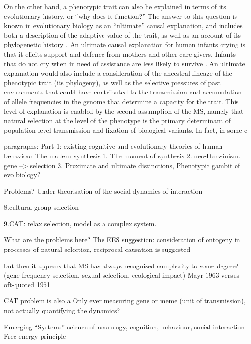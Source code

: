On the other hand, a phenotypic trait can also be explained in terms of its evolutionary history, or ``why does it function?''  The answer to this question is known in evolutionary biology as an ``ultimate'' causal explanation, and includes both a description of the adaptive value of the trait, as well as an account of its phylogenetic history \citep{Mayr1961,Tinbergen1963}. An ultimate causal explanation for human infants crying is that it elicits support and defence from mothers and other care-givers.  Infants that do not cry when in need of assistance are less likely to survive \citep[38]{Scott-Phillips2011}. An ultimate explanation would also include a consideration of the ancestral lineage of the phenotypic trait (its phylogeny), as well as the selective pressures of past environments that could have contributed to the transmission and accumulation of allele frequencies in the genome that determine a capacity for the trait.  This level of explanation is enabled by the second assumption of the MS, namely that natural selection at the level of the phenotype is the primary determinant of population-level transmission and fixation of biological variants.  In fact, in some c




paragraphs:
Part 1: existing cognitive and evolutionary theories of human behaviour
The modern synthesis
    1. The moment of synthesis
    2. neo-Darwinism: gene --> selection
    3. Proximate and ultimate distinctions, Phenotypic gambit of evo biology?




Problems?
Under-theorisation of the social dynamics of interaction

    8.cultural group selection

    9.CAT: relax selection, model as a complex system.

What are the problems here?
  The EES suggestion: consideration of ontogeny in processes of natural selection, reciprocal causation is suggested

  but then it appears that MS has always recognised complexity to some degree?
   (gene frequency selection, sexual selection, ecological impact)
   Mayr 1963 versus oft-quoted 1961


  CAT problem is also a Only ever measuring gene or meme (unit of transmission), not actually quantifying the dynamics?

Emerging ``Systems'' science of neurology, cognition, behaviour, social interaction
Free energy principle


